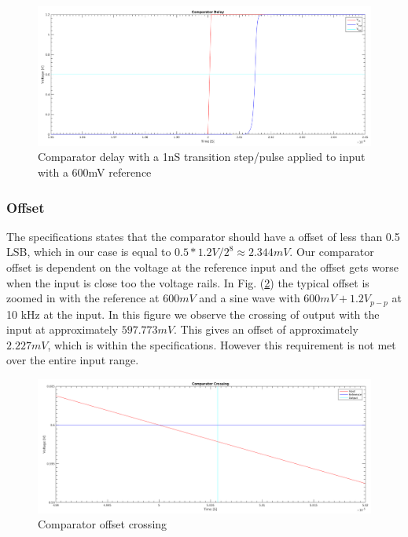 \documentclass[english, 12pt, a4paper]{ifimaster}
\begin{document}
\begin{figure}[!ht]
    \centering
    \includegraphics[width=\textwidth]{img/comparator/comparator_delay_1ns_tr_600mv_ref}
    \caption{Comparator delay with a 1nS transition step/pulse applied to input with a 600mV reference}
    \label{figure:comparator:comparator_delay}
\end{figure}

\subsubsection{Offset}
The specifications states that the comparator should have a offset of less than 0.5 LSB, which in our case is equal to \(0.5 * 1.2V/2^8 \approx 2.344mV\). 
Our comparator offset is dependent on the voltage at the reference input and the offset gets worse when the input is close too the voltage rails.
In Fig. (\ref{figure:comparator:comparator_crossing}) the typical offset is zoomed in with the reference at \(600 mV\) and a sine wave with \(600 mV + 1.2V_{p-p}\) at 10 kHz at the input. 
In this figure we observe the crossing of output with the input at approximately \(597.773 mV\). This gives an offset of approximately \(2.227 mV\), which is within the specifications. 
However this requirement is not met over the entire input range.

\begin{figure}[!ht]
    \centering
    \includegraphics[width=\textwidth]{img/comparator/comparator_crossing}
    \caption{Comparator offset crossing}
    \label{figure:comparator:comparator_crossing}
\end{figure}
\end{document}
